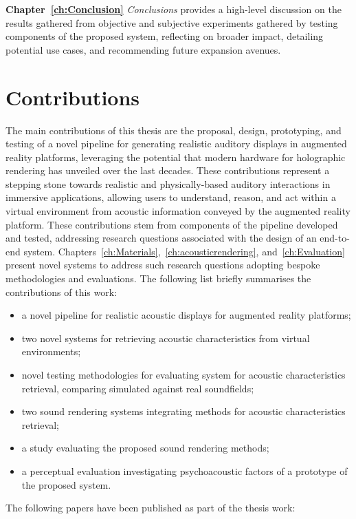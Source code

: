 \textbf{Chapter~\ref{ch:Conclusion}} \textit{Conclusions} provides a high-level discussion on the results gathered from objective and subjective experiments gathered by testing components of the proposed system, reflecting on broader impact, detailing potential use cases, and recommending future expansion avenues.

\section{Contributions}
The main contributions of this thesis are the proposal, design, prototyping, and testing of a novel pipeline for generating realistic auditory displays in augmented reality platforms, leveraging the potential that modern hardware for holographic rendering has unveiled over the last decades. These contributions represent a stepping stone towards realistic and physically-based auditory interactions in immersive applications, allowing users to understand, reason, and act within a virtual environment from acoustic information conveyed by the augmented reality platform.
These contributions stem from components of the pipeline developed and tested, addressing research questions associated with the design of an end-to-end system. Chapters~\ref{ch:Materials},~\ref{ch:acousticrendering}, and~\ref{ch:Evaluation} present novel systems to address such research questions adopting bespoke methodologies and evaluations. The following list briefly summarises the contributions of this work:
\begin{itemize}
    \item a novel pipeline for realistic acoustic displays for augmented reality platforms;
    \item two novel systems for retrieving acoustic characteristics from virtual environments;
    \item novel testing methodologies for evaluating system for acoustic characteristics retrieval, comparing simulated against real soundfields;
    \item two sound rendering systems integrating methods for acoustic characteristics retrieval;
    \item a study evaluating the proposed sound rendering methods;
    \item a perceptual evaluation investigating psychoacoustic factors of a prototype of the proposed system.
\end{itemize}

The following papers have been published as part of the thesis work:


